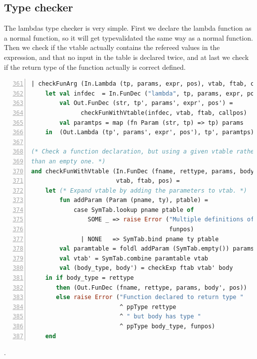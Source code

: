 \documentclass[11pt]{article}
\begin{document}
\subsection{Type checker}
The lambdas type checker is very simple. First we declare the lambda function as a normal function, so
it will get typevalidated the same way as a normal function. 
Then we check if the vtable actually contains the refereed values in the expression, and that no input in 
the table is declared twice, and at last we check if the return type of the function actually is correct defined.
 \begin{lstlisting}[language=ML,basicstyle=\footnotesize,caption={Lambda in TypeChecker.sml },firstnumber=361,breaklines=false,numbers=left]
  | checkFunArg (In.Lambda (tp, params, expr, pos), vtab, ftab, callpos) =
    let val infdec  = In.FunDec ("lambda", tp, params, expr, pos)
        val Out.FunDec (str, tp', params', expr', pos') =
              checkFunWithVtable(infdec, vtab, ftab, callpos)
        val paramtps = map (fn Param (str, tp) => tp) params
    in  (Out.Lambda (tp', params', expr', pos'), tp', paramtps) end

(* Check a function declaration, but using a given vtable rather
than an empty one. *)
and checkFunWithVtable (In.FunDec (fname, rettype, params, body, funpos),
                        vtab, ftab, pos) =
    let (* Expand vtable by adding the parameters to vtab. *)
        fun addParam (Param (pname, ty), ptable) =
            case SymTab.lookup pname ptable of
                SOME _ => raise Error ("Multiple definitions of parameter name " ^ pname,
                                       funpos)
              | NONE   => SymTab.bind pname ty ptable
        val paramtable = foldl addParam (SymTab.empty()) params
        val vtab' = SymTab.combine paramtable vtab
        val (body_type, body') = checkExp ftab vtab' body
    in if body_type = rettype
       then (Out.FunDec (fname, rettype, params, body', pos))
       else raise Error ("Function declared to return type "
                         ^ ppType rettype
                         ^ " but body has type "
                         ^ ppType body_type, funpos)
    end

\end{lstlisting}
.
\end{document}
